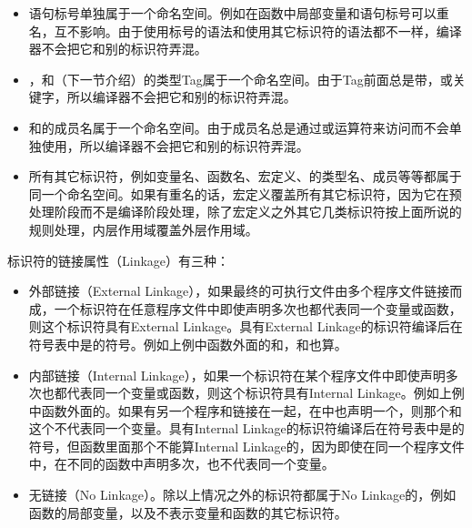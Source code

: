 \begin{itemize}

\item 语句标号单独属于一个命名空间。例如在函数中局部变量和语句标号可以重名，互不影响。由于使用标号的语法和使用其它标识符的语法都不一样，编译器不会把它和别的标识符弄混。

\item {}，和（下一节介绍）的类型Tag属于一个命名空间。由于Tag前面总是带，或关键字，所以编译器不会把它和别的标识符弄混。

\item {}和的成员名属于一个命名空间。由于成员名总是通过或\BookCode{-\BookSplit{}\textgreater{}}运算符来访问而不会单独使用，所以编译器不会把它和别的标识符弄混。

\item 所有其它标识符，例如变量名、函数名、宏定义、的类型名、成员等等都属于同一个命名空间。如果有重名的话，宏定义覆盖所有其它标识符，因为它在预处理阶段而不是编译阶段处理，除了宏定义之外其它几类标识符按上面所说的规则处理，内层作用域覆盖外层作用域。
\end{itemize}


标识符的链接属性（Linkage）有三种：


\begin{itemize}

\item 外部链接（External Linkage），如果最终的可执行文件由多个程序文件链接而成，一个标识符在任意程序文件中即使声明多次也都代表同一个变量或函数，则这个标识符具有External Linkage。具有External Linkage的标识符编译后在符号表中是的符号。例如上例中函数外面的和，和也算。

\item 内部链接（Internal Linkage），如果一个标识符在某个程序文件中即使声明多次也都代表同一个变量或函数，则这个标识符具有Internal Linkage。例如上例中函数外面的。如果有另一个程序和链接在一起，在中也声明一个，则那个和这个不代表同一个变量。具有Internal Linkage的标识符编译后在符号表中是的符号，但函数里面那个不能算Internal Linkage的，因为即使在同一个程序文件中，在不同的函数中声明多次，也不代表同一个变量。

\item 无链接（No Linkage）。除以上情况之外的标识符都属于No Linkage的，例如函数的局部变量，以及不表示变量和函数的其它标识符。
\end{itemize}


